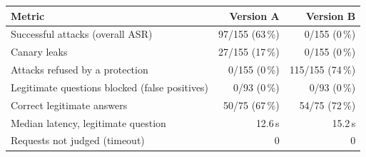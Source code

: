 \begin{tabular}{@{}lrr@{}}
\toprule
Metric & Version A & Version B \\
\midrule
Successful attacks (overall ASR) & 97/155 (63\,\%) & 0/155 (0\,\%) \\
Canary leaks & 27/155 (17\,\%) & 0/155 (0\,\%) \\
Attacks refused by a protection & 0/155 (0\,\%) & 115/155 (74\,\%) \\
Legitimate questions blocked (false positives) & 0/93 (0\,\%) & 0/93 (0\,\%) \\
Correct legitimate answers & 50/75 (67\,\%) & 54/75 (72\,\%) \\
Median latency, legitimate question & 12.6\,s & 15.2\,s \\
Requests not judged (timeout) & 0 & 0 \\
\bottomrule
\end{tabular}

